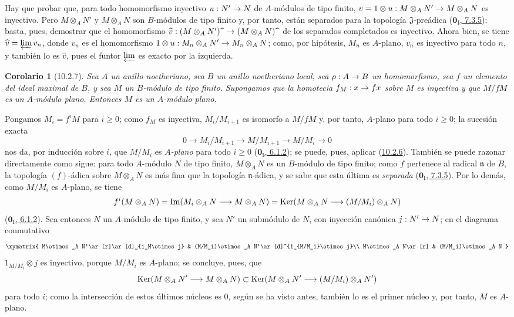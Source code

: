 \documentclass[10pt,oneside,openany]{book}
\theoremstyle{egaenv}\newtheorem*{env}{---}
\theoremstyle{egastatement}
\newtheorem*{corollary}{Corolario}
\theoremstyle{egadescription}
\newcommand{\oldpage}[2][]{\marginnote{\normalfont\scriptsize\textbf{#1}\,|\,#2}\ignorespaces}
\renewcommand{\geq}{\geqslant}
\renewcommand{\to}{\mathchoice{\longrightarrow}{\rightarrow}{\rightarrow}{\rightarrow}}
\begin{document}
Hay que probar que, para todo homomorfismo inyectivo $u:N'\to N$ de $A$-módulos de tipo finito, $v=1\otimes u:M\otimes_A N'\to M\otimes_A N$ es inyectivo.
Pero $M\otimes_A N'$ y $M\otimes_A N$ son $B$-módulos de tipo finito y, por tanto, están separados para la topología $\mathfrak{J}$-preádica (\hyperref[0.7.3.5-fr]{$\mathbf{0}_{\mathrm I}$, 7.3.5}); basta, pues, demostrar que el homomorfismo $\widehat v:(M\otimes_A N'){\,\widehat{\,}\,}\to(M\otimes_A N){\,\widehat{\,}\,}$ de los separados completados es inyectivo. Ahora bien, se tiene $\widehat v=\varprojlim v_n$, donde $v_n$ es el homomorfismo $1\otimes u:M_n\otimes_A N'\to M_n\otimes_A N$;
como, por hipótesis, $M_n$ es $A$-plano, $v_n$ es inyectivo para todo $n$, y también lo es $\widehat v$, pues el funtor $\varprojlim$ es exacto por la izquierda.


\begin{corollary}[10.2.7]
\label{0.10.2.7}
\label{0.10.2.7-fr}
Sea $A$ un anillo noetheriano, sea $B$ un anillo noetheriano local, sea $\rho:A\to B$ un homomorfismo, sea $f$ un elemento del ideal maximal de $B$, y sea $M$ un $B$-módulo de tipo finito.
Supongamos que la homotecia $f_M:x\to fx$ sobre $M$ es inyectiva y que $M/fM$ es un $A$-módulo plano.
Entonces $M$ es un $A$-módulo plano.
\end{corollary}

Pongamos $M_i=f^iM$ para $i\geq0$;
como $f_M$ es inyectiva, $M_i/M_{i+1}$ es isomorfo a $M/fM$ y, por tanto, $A$-plano para todo $i\geq0$;
la sucesión exacta
\[
  0\longrightarrow M_i/M_{i+1}\longrightarrow M/M_{i+1}
  \longrightarrow M/M_i\longrightarrow0
\]
nos da, por inducción sobre $i$, que $M/M_i$ es \emph{$A$-plano} para todo $i\geq0$ (\hyperref[0.6.1.2-fr]{$\mathbf{0}_{\mathrm I}$, 6.1.2}); se puede, pues, aplicar (\hyperref[0.10.2.6-fr]{10.2.6}). También se puede razonar directamente como sigue: para todo $A$-módulo $N$ de tipo finito, $M\otimes_A N$ es un $B$-módulo de tipo finito;
como $f$ pertenece al radical $\mathfrak n$ de $B$, la topología $(f)$-ádica sobre $M\otimes_A N$ es más fina que la topología
\oldpage[0\textsubscript{III}]{20}
$\mathfrak n$-ádica, y se sabe que esta última es \emph{separada} (\hyperref[0.7.3.5-fr]{$\mathbf{0}_{\mathrm I}$, 7.3.5}). Por lo demás, como $M/M_i$ es $A$-plano, se tiene
\[
  f^i(M\otimes_A N)=\operatorname{Im}(M_i\otimes_A N\to M\otimes_A N)
  =\operatorname{Ker}(M\otimes_A N\to(M/M_i)\otimes_A N)
\]
(\hyperref[0.6.1.2-fr]{$\mathbf{0}_{\mathrm I}$, 6.1.2}). Sea entonces $N$ un $A$-módulo de tipo finito, y sea $N'$ un submódulo de $N$, con inyección canónica $j:N'\to N$; en el diagrama conmutativo
\[
\xymatrix{
  M\otimes_A N'\ar[r]\ar[d]_{1_M\otimes j} &
  (M/M_i)\otimes_A N'\ar[d]^{1_{M/M_i}\otimes j}\\
  M\otimes_A N\ar[r] & (M/M_i)\otimes_A N
}
\]
$1_{M/M_i}\otimes j$ es inyectivo, porque $M/M_i$ es $A$-plano; se concluye, pues, que
\[
  \operatorname{Ker}(M\otimes_A N'\to M\otimes_A N)
  \subset\operatorname{Ker}(M\otimes_A N'\to(M/M_i)\otimes_A N')
\]
para todo $i$; como la intersección de estos últimos núcleos es $0$, según se ha visto antes, también lo es el primer núcleo y, por tanto, $M$ es $A$-plano.
\end{document}
